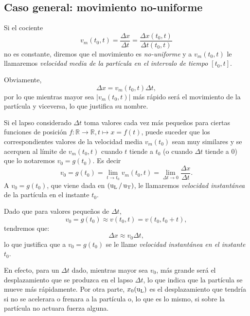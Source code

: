 \subsection{Caso general: movimiento no-uniforme}

Si el cociente
\[
 v_{m}(t_{0},t) = \frac{\Delta x}{\Delta t} = \frac{\Delta x(t_{0},t)}{\Delta t(t_{0},t)}
\]
no es constante, diremos que el movimiento es \emph{no-uniforme} y a $v_{m}(t_{0},t) $ le
llamaremos \emph{velocidad media de la partícula en el intervalo de tiempo $[t_{0},t]$}.

Obviamente,
\[
\Delta x = v_{m}(t_{0},t)\Delta t,
\]
por lo que mientras mayor sea $|v_{m}(t_{0},t)|$ más rápido será el movimiento de la partícula y viceversa, lo que justifica su nombre.

Si el lapso considerado $\Delta t$ toma valores cada vez más pequeños para ciertas funciones de
posición $f\colon\mathbb{R}\rightarrow\mathbb{R},t\mapsto x=f(t)$, puede suceder que los
correspondientes valores de la velocidad media $v_{m}(t_{0})$ sean muy similares y se acerquen al
límite de $v_{m}(t_{0},t)$ cuando $t$ tiende a $t_{0}$ (o cuando $\Delta t $ tiende a 0) que lo
notaremos $v_{0} = g(t_{0})$. Es decir
\[
v_{0} = g(t_{0}) = \lim_{t \rightarrow t_{0}}v_{m}(t_{0},t) = \lim_{\Delta t \rightarrow 0}\frac{\Delta x}{\Delta t}.
\]
A $v_{0} = g(t_{0})$, que viene dada en $(\operatorname{u_L}/ \operatorname{u_T})$, le llamaremos \emph{velocidad instantánea} de la partícula en el instante $t_{0}$.

Dado que para valores pequeños de $\Delta t$,
\[
v_{0} = g(t_{0})\approx v(t_{0},t) = v(t_{0},t_{0} + t),
\]
tendremos que:
\[
\Delta x \approx  v_{0} \Delta t,
\]
lo que justifica que a $v_{0} = g(t_{0})$ se le llame \emph{velocidad instantánea en el instante
$t_{0}$}.

En efecto, para un $\Delta t$ dado, mientras mayor sea $v_{0}$, más grande será el desplazamiento
que se produzca en el lapso $\Delta t$, lo que indica que la partícula se mueve más rápidamente.
Por otra parte, $x_{0}(\operatorname{u_L})$ es el desplazamiento que tendría si no se acelerara o frenara a la
partícula o, lo que es lo mismo, si sobre la partícula no actuara fuerza alguna.


